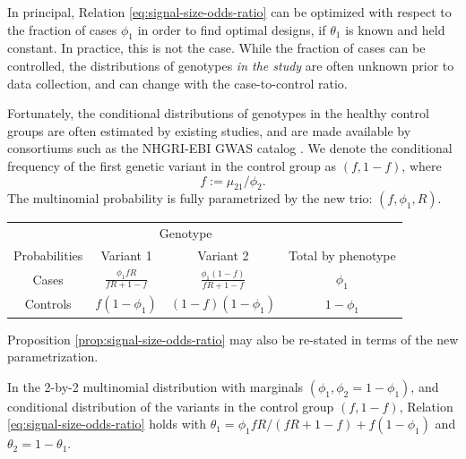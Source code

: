 In principal, Relation \eqref{eq:signal-size-odds-ratio} can be optimized with respect to the fraction of cases $\phi_1$ in order to find optimal designs, if $\theta_1$ is known and held constant.
In practice, this is not the case.
While the fraction of cases can be controlled, the distributions of genotypes \emph{in the study} are often unknown prior to data collection, and can change with the case-to-control ratio.

Fortunately, the conditional distributions of genotypes in the healthy control groups are often estimated by existing studies, and are made available by consortiums such as the NHGRI-EBI GWAS catalog \cite{macarthur2016new}.
We denote the conditional frequency of the first genetic variant in the control group as $(f, 1-f)$, where
$$
f := \mu_{21} / \phi_2.
$$
The multinomial probability is fully parametrized by the new trio: $(f, \phi_1, R)$.
\begin{center}
    \begin{tabular}{cccc}
    \hline
    & \multicolumn{2}{c}{Genotype} \\
    \cline{2-3}
    Probabilities & Variant 1 & Variant 2 & Total by phenotype \\
    \hline
    Cases & $\frac{\phi_1fR}{fR+1-f}$ & $\frac{\phi_1(1-f)}{fR+1-f}$ & $\phi_1$ \\
    Controls & $f(1-\phi_1)$ & $(1-f)(1-\phi_1)$ & $1-\phi_1$ \\
    \hline
    \end{tabular}
\end{center}
Proposition \ref{prop:signal-size-odds-ratio} may also be re-stated in terms of the new parametrization.


\begin{corollary} \label{cor:signal-size-odds-ratio-conditional-frequency}
In the 2-by-2 multinomial distribution with marginals $(\phi_1, \phi_2 = 1-\phi_1)$, and conditional distribution of the variants in the control group $(f, 1-f)$,
Relation \eqref{eq:signal-size-odds-ratio} holds with $\theta_1 = {\phi_1fR}/{(fR+1-f)} + f(1-\phi_1)$ and $\theta_2 = 1-\theta_1$.
\end{corollary} 

